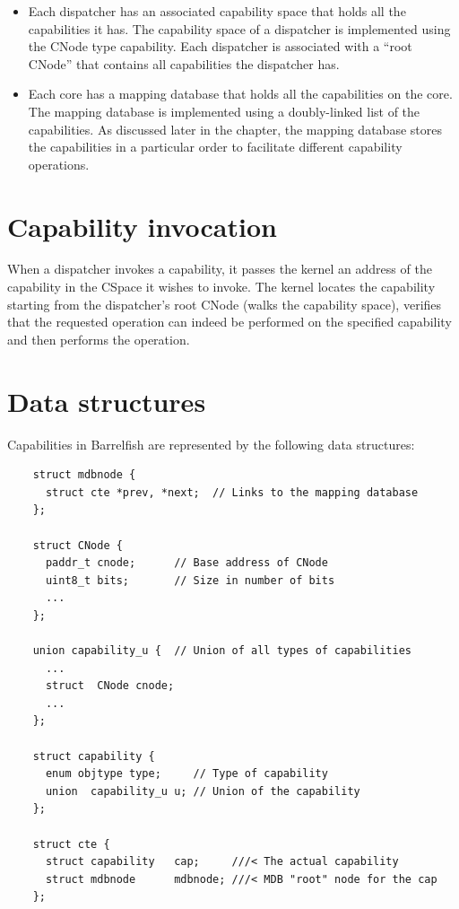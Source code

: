 \documentclass[a4paper,twoside]{report} %
\begin{document}
\begin{itemize}
\item Each dispatcher has an associated capability space that holds
  all the capabilities it has.  The capability space of a dispatcher
  is implemented using the CNode type capability. Each dispatcher is
  associated with a ``root CNode'' that contains all capabilities the
  dispatcher has.
\item Each core has a mapping database that holds all the capabilities
  on the core. The mapping database is implemented using a
  doubly-linked list of the capabilities. As discussed later in the
  chapter, the mapping database stores the capabilities in a
  particular order to facilitate different capability operations.
\end{itemize}

\section{Capability invocation}
When a dispatcher invokes a capability, it passes the kernel an
address of the capability in the CSpace it wishes to invoke. The
kernel locates the capability starting from the dispatcher's root
CNode (walks the capability space), verifies that the requested
operation can indeed be performed on the specified capability and then
performs the operation.

\section{Data structures}
Capabilities in Barrelfish are represented by the following data
structures:

{\scriptsize
\begin{verbatim}
    struct mdbnode {
      struct cte *prev, *next;  // Links to the mapping database
    };

    struct CNode {
      paddr_t cnode;      // Base address of CNode
      uint8_t bits;       // Size in number of bits
      ...
    };

    union capability_u {  // Union of all types of capabilities
      ...
      struct  CNode cnode;
      ...
    };

    struct capability {
      enum objtype type;     // Type of capability
      union  capability_u u; // Union of the capability
    };

    struct cte {
      struct capability   cap;     ///< The actual capability
      struct mdbnode      mdbnode; ///< MDB "root" node for the cap
    };
\end{verbatim}
}
\end{document}
